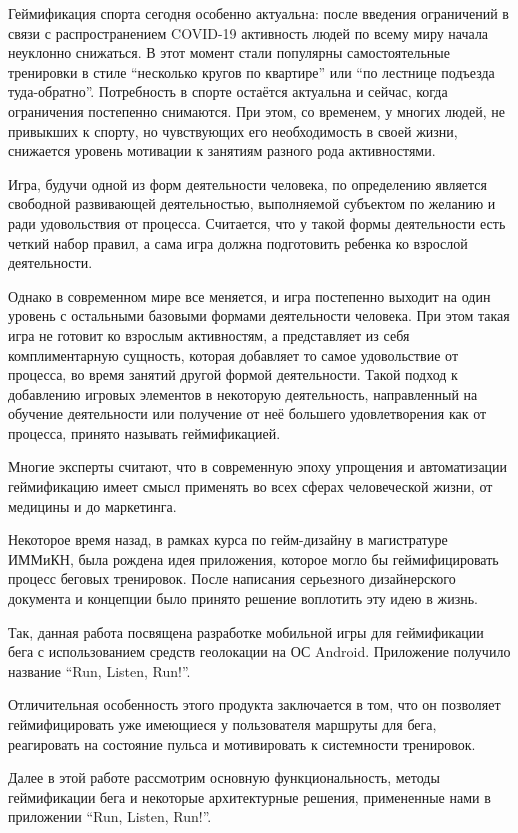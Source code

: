\Intro

Геймификация спорта сегодня особенно актуальна: после введения ограничений в связи с распространением COVID-19 активность людей по всему миру начала неуклонно снижаться. В этот момент стали популярны самостоятельные тренировки в стиле ``несколько кругов по квартире'' или ``по лестнице подъезда туда-обратно''. Потребность в спорте остаётся актуальна и сейчас, когда ограничения постепенно снимаются. При этом, со временем, у многих людей, не привыкших к спорту, но чувствующих его необходимость в своей жизни, снижается уровень мотивации к занятиям разного рода активностями. 

Игра, будучи одной из форм деятельности человека, по определению является свободной развивающей деятельностью, выполняемой субъектом по желанию и ради удовольствия от процесса. Считается, что у такой формы деятельности есть четкий набор правил, а сама игра должна подготовить ребенка ко взрослой деятельности.

Однако в современном мире все меняется, и игра постепенно выходит на один уровень с остальными базовыми формами деятельности человека. При этом такая игра не готовит ко взрослым активностям, а представляет из себя комплиментарную сущность, которая добавляет то самое удовольствие от процесса, во время занятий другой формой деятельности. Такой подход к добавлению игровых элементов в некоторую деятельность, направленный на обучение деятельности или получение от неё большего удовлетворения как от процесса, принято называть геймификацией.  

Многие эксперты считают, что в современную эпоху упрощения и автоматизации геймификацию имеет смысл применять во всех сферах человеческой жизни, от медицины и до маркетинга.

Некоторое время назад, в рамках курса по гейм-дизайну в магистратуре ИММиКН, была рождена идея приложения, которое могло бы геймифицировать процесс беговых тренировок. После написания серьезного дизайнерского документа и концепции было принято решение воплотить эту идею в жизнь.

Так, данная работа посвящена разработке мобильной игры для геймификации бега с использованием средств геолокации на ОС Android. Приложение получило название ``Run, Listen, Run!''.

Отличительная особенность этого продукта заключается в том, что он позволяет геймифицировать уже имеющиеся у пользователя маршруты для бега, реагировать на состояние пульса и мотивировать к системности тренировок.

Далее в этой работе рассмотрим основную функциональность, методы геймификации бега и некоторые архитектурные решения, примененные нами в приложении ``Run, Listen, Run!''.


